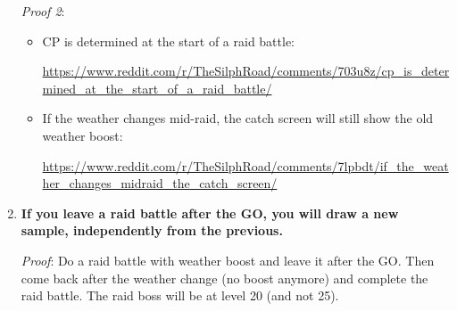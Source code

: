 \documentclass[12pt]{beamer}
\begin{document}
\begin{frame}
\begin{block}{}
\begin{footnotesize}
\begin{enumerate}
\emph{Proof 2}:
\begin{itemize}
  \item \footnotesize CP is determined at the start of a raid battle:
  
\footnotesize \url{https://www.reddit.com/r/TheSilphRoad/comments/703u8z/cp_is_determined_at_the_start_of_a_raid_battle/}
  \item\footnotesize If the weather changes mid-raid, the catch screen will still show the old weather boost: 
  
\footnotesize \url{https://www.reddit.com/r/TheSilphRoad/comments/7lpbdt/if_the_weather_changes_midraid_the_catch_screen/}
\end{itemize}

  \item \textbf{If you leave a raid battle after the GO, you will draw a new sample, independently from the previous.}

\emph{Proof}: Do a raid battle with weather boost and leave it after the GO. Then come back after the weather change (no boost anymore) and complete the raid battle. The raid boss will be at level 20 (and not 25). 
\end{enumerate}


\end{footnotesize}
\end{block}
\end{frame}
\end{document}
